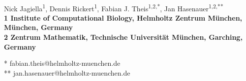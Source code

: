 \documentclass[10pt,letterpaper]{article}
\date{}
\begin{document}
\vspace*{0.35in}

\begin{flushleft}
{\Large
\textbf{}
}
\newline
\\
Nick Jagiella\textsuperscript{1},
Dennis Rickert\textsuperscript{1},
Fabian J. Theis\textsuperscript{1,2,*},
Jan Hasenauer\textsuperscript{1,2,**}
\\
\bigskip
\bf{1} Institute of Computational Biology, Helmholtz Zentrum M\"unchen, M\"unchen, Germany
\\
\bf{2} Zentrum Mathematik, Technische Universit\"at M\"unchen, Garching, Germany
\\
\bigskip

% 
%





* fabian.theis@helmholtz-muenchen.de\\
** jan.hasenauer@helmholtz-muenchen.de

\end{flushleft}
\end{document}
